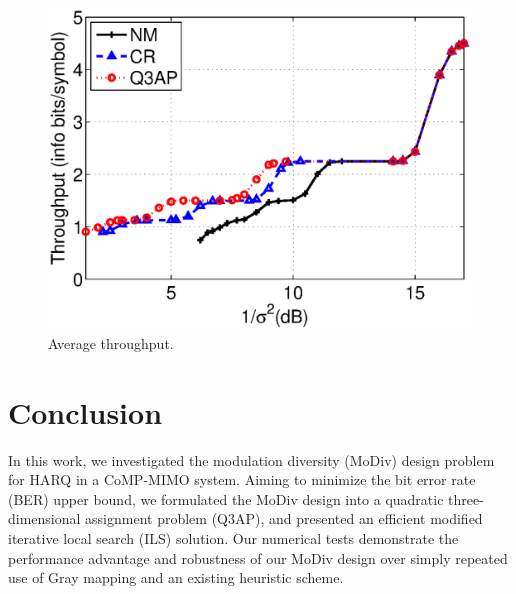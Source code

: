 \documentclass[journal]{IEEEtran}
\begin{document}
\begin{figure}[!t]
  \centering
  \includegraphics[width=0.75\columnwidth]{./figs/throughput.eps}
  \vspace{-10pt}
  \caption{Average throughput.}
  \label{fig:coded_throughput}
\end{figure}

\section{Conclusion}
\label{sec:conclusion}
In this work, we investigated the modulation diversity (MoDiv) design problem
for HARQ in a CoMP-MIMO system. Aiming to minimize the bit error rate (BER)
upper bound, we formulated the MoDiv design into a quadratic three-dimensional
assignment problem (Q3AP), and presented an efficient modified iterative local
search (ILS) solution. Our numerical tests demonstrate the performance advantage
and robustness of our MoDiv design over simply repeated use of Gray mapping
and an existing heuristic scheme.
%
%
\end{document}
